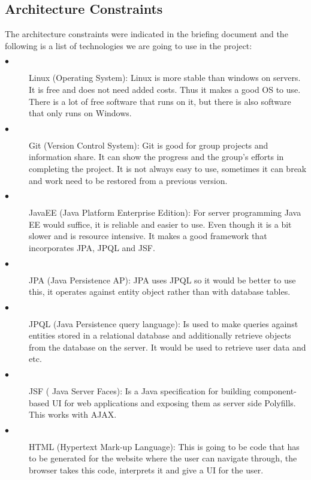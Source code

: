 \documentclass[12pt]{article}
\begin{document}
\subsection{Architecture Constraints}

The architecture constraints were indicated in the briefing document and the following is a list of technologies we are going to use in the project:

\begin{description}
  \item[$\bullet$] Linux (Operating System):
  Linux is more stable than windows on servers. It is free and does not need added costs. Thus it makes a good OS to use. There is a lot of free software that runs on it, but there is also software that only runs on Windows. 
  
  \item[$\bullet$] Git (Version Control System):
  Git is good for group projects and information share. It can show the progress and the group’s efforts in completing the project. It is not always easy to use, sometimes it can break and work need to be restored from a previous version.
  
  \item[$\bullet$] JavaEE (Java Platform Enterprise Edition):
  For server programming Java EE would suffice, it is reliable and easier to use. Even though it is a bit slower and is resource intensive. It makes a good framework that incorporates JPA,  JPQL and JSF.
  
  \item[$\bullet$]JPA (Java Persistence AP):
  JPA uses JPQL so it would be better to use this, it operates against entity object rather than with database tables.
  
  \item[$\bullet$] JPQL (Java Persistence query language):
  Is used to make queries against entities stored in a relational database and additionally retrieve objects from the database on the server. It would be used to retrieve user data and etc. 
  
  \item[$\bullet$] JSF ( Java Server Faces):
  Is a Java specification for building component-based UI for web applications and exposing them as server side Polyfills. This works with AJAX. 
  
  \item[$\bullet$] HTML (Hypertext Mark-up Language):
  This is going to be code that has to be generated for the website where the user can navigate through, the browser takes this code, interprets it and give a UI for the user. 
  

\end{description}
\end{document}
